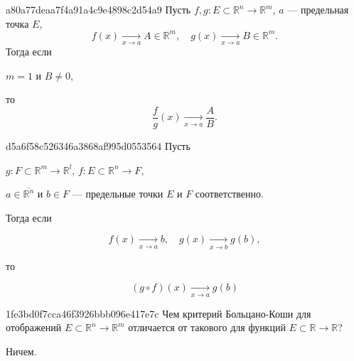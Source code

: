 \begin{note}{a80a77deaa7f4a91a4c9e4898c2d54a9}
    Пусть \({ f, g : E \subset \mathbb R^{n} \to \mathbb R^{m} }\),\: \({ a }\) --- предельная точка \({ E }\),
    \[
        f(x) \underset{x \to a}\longrightarrow A \in \mathbb R^{m}, \quad g(x) \underset{x \to a}\longrightarrow B \in \mathbb R^{m}.
    \]
    Тогда если \begin{icloze}{1}\({ m = 1 }\) и \({ B \neq 0 }\),\end{icloze} то
    \[
        \frac{f}{g}(x) \underset{x \to a}\longrightarrow \frac{A}{B}.
    \]
\end{note}

\begin{note}{d5a6f58c526346a3868af995d0553564}
    Пусть \begin{icloze}{4}\({ g : F \subset \mathbb R^{m} \to \mathbb R^{l} }\),\: \({ f : E \subset \mathbb R^{n} \to F }\),\end{icloze}\: \begin{icloze}{3}\({ a \in \overline{\mathbb R^{n}} }\) и \({ b \in F }\) --- предельные точки \({ E }\) и \({ F }\) соответственно.\end{icloze} Тогда если
    \begin{icloze}{2}
        \[
            f(x) \underset{x \to a}\longrightarrow b, \quad g(x) \underset{x \to b}\longrightarrow g(b),
        \]
    \end{icloze}
    то
    \begin{icloze}{1}
        \[
            (g \circ f)(x) \underset{x \to a}\longrightarrow g(b)
        \]
    \end{icloze}
\end{note}

\begin{note}{1fe3bd0f7cca46f3926bbb096e417e7c}
    Чем критерий Больцано-Коши для отображений \({ E \subset \mathbb R^{n} \to \mathbb R^{m} }\) отличается от такового для функций \({ E \subset \mathbb R \to \mathbb R }\)?

    \begin{cloze}{1}
        Ничем.
    \end{cloze}
\end{note}


